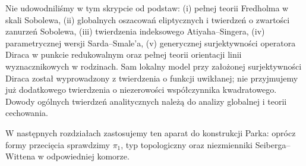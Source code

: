 Nie udowodniliśmy w tym skrypcie od podstaw:
(i) pełnej teorii Fredholma w skali Sobolewa,
(ii) globalnych oszacowań eliptycznych i twierdzeń o
zwartości zanurzeń Sobolewa,
(iii) twierdzenia indeksowego Atiyaha--Singera,
(iv) parametrycznej wersji Sarda--Smale'a,
(v) generycznej surjektywności operatora Diraca
w punkcie redukowalnym oraz pełnej teorii orientacji
linii wyznacznikowych w rodzinach.
Sam lokalny model przy założonej surjektywności
Diraca został wyprowadzony z twierdzenia o funkcji
uwikłanej; nie przyjmujemy już dodatkowego
twierdzenia o niezerowości współczynnika
kwadratowego. Dowody ogólnych twierdzeń analitycznych
należą do analizy globalnej i teorii cechowania.

\begin{uwaga}
W następnych rozdziałach zastosujemy ten aparat
do konstrukcji Parka: oprócz formy przecięcia
sprawdzimy $\pi_1$, typ topologiczny oraz niezmienniki
Seiberga--Wittena w odpowiedniej komorze.
\end{uwaga}


